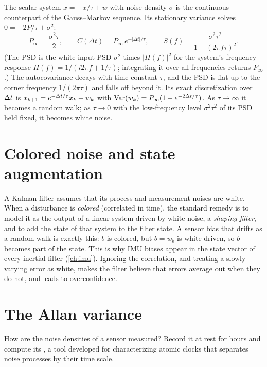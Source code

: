 The scalar system $\dot x = -x/\tau + w$ with noise density $\sigma$ is the continuous counterpart of the Gauss--Markov sequence. Its stationary
variance solves $0 = -2P/\tau + \sigma^2$:
\begin{equation}
  P_\infty = \frac{\sigma^2\tau}{2}, \qquad C(\Delta t) = P_\infty\,e^{-|\Delta t|/\tau}, \qquad S(f) = \frac{\sigma^2\tau^2}{1 + (2\pi f\tau)^2} .
\end{equation}
(The PSD is the white input PSD $\sigma^2$ times $|H(f)|^2$ for the system's frequency response $H(f) = 1/(i2\pi f + 1/\tau)$; integrating it over all
frequencies returns $P_\infty$.) The autocovariance decays with time constant $\tau$, and the PSD is flat up to the corner frequency $1/(2\pi\tau)$ and
falls off beyond it. Its exact discretization over ${\Delta t}$ is $x_{k+1} = e^{-{\Delta t}/\tau}x_k + w_k$ with $\operatorname{Var}(w_k) = P_\infty(1 - e^{-2{\Delta t}/\tau})$. As
$\tau\to\infty$ it becomes a random walk; as $\tau\to0$ with the low-frequency level $\sigma^2\tau^2$ of its PSD held fixed, it becomes white noise.

\section{Colored noise and state augmentation}

A Kalman filter assumes that its process and measurement noises are white. When a disturbance is \emph{colored} (correlated in time), the
standard remedy is to model it as the output of a linear system driven by white noise, a \emph{shaping filter}, and to add the state of that
system to the filter state. A sensor bias that drifts as a random walk is exactly this: $b$ is colored, but $\dot b = w_b$ is white-driven, so
$b$ becomes part of the state. This is why IMU biases appear in the state vector of every inertial filter (\cref{ch:imu}). Ignoring the
correlation, and treating a slowly varying error as white, makes the filter believe that errors average out when they do not, and leads to
overconfidence.

\section{The Allan variance}
\label{sec:allan}

How are the noise densities of a sensor measured? Record it at rest for hours and compute its , a tool developed for
characterizing atomic clocks that separates noise processes by their time scale.

